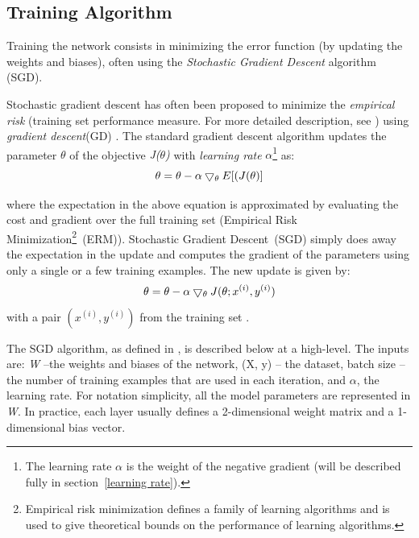 \subsection{Training Algorithm}
\label{subsec:sgd}
Training the network consists in minimizing the error function (by updating the weights and biases), often using the \textit{Stochastic Gradient Descent} algorithm (SGD). 

Stochastic gradient descent has often been proposed to minimize the \textit{empirical risk} (training set performance measure. For more detailed description, see \cite{vapnik1998statistical}) using \textit{gradient descent}(GD) \cite{bottou2010large}. The standard gradient descent algorithm updates the parameter $\theta$ of the objective \textit{J($\theta$)} with \textit{learning rate} $\alpha$\footnote{The learning rate $\alpha$ is the weight of the negative gradient (will be described fully in section~\ref{learning rate}).} as:
\begin{equation}
\centering \theta = \theta - \alpha \bigtriangledown_\theta E[(J(\theta)]
\end{equation}

where the expectation in the above equation is approximated by evaluating the cost and gradient over the full training set (Empirical Risk Minimization\footnote{Empirical risk minimization defines a family of learning algorithms and is used to give theoretical bounds on the performance of learning algorithms.}~(ERM)). Stochastic Gradient Descent~(SGD) simply does away the expectation in the update and computes the gradient of the parameters using only a single or a few training examples. The new update is given by:
\begin{equation}
\centering \theta = \theta - \alpha \bigtriangledown_\theta J(\theta; x^{(i)}, y^{(i)})
\end{equation}
with a pair $(x^{(i)}, y^{(i)})$ from the training set \cite{sgd}. 

The SGD algorithm, as defined in \cite{duda2012pattern}, is described below at a high-level. The inputs
are: \textit{W} --the weights and biases of the network, (X, y) -- the dataset, batch size -- the number of training examples that are used in each iteration, and $\alpha$, the learning rate. For notation simplicity, all the model parameters are represented in \textit{W}. In practice, each
layer usually defines a 2-dimensional weight matrix and a 1-dimensional bias vector.

